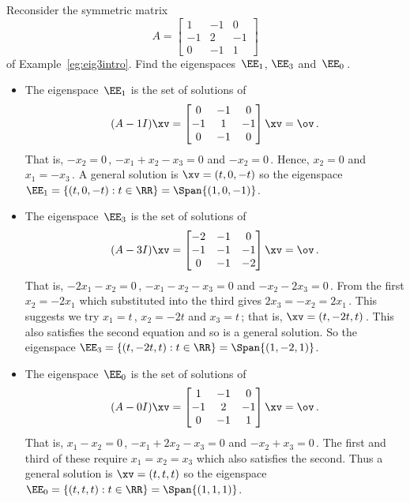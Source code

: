 \begin{example} \label{eg:eig3sp}
Reconsider the symmetric matrix
\begin{equation*}
A=\begin{bmatrix} 1&-1&0\\-1&2&-1\\0&-1&1 \end{bmatrix}
\end{equation*}
of Example~\ref{eg:eig3intro}. 
Find the eigenspaces~\(\EE_1\), \(\EE_3\) and~\(\EE_0\)\,.
\begin{solution} 
\begin{itemize}
\item The eigenspace~\(\EE_1\) is the set of solutions of
\begin{equation*}
(A-1I)\xv=\begin{bmatrix} 0&-1&0\\-1&1&-1\\0&-1&0 \end{bmatrix}
\xv=\ov\,.
\end{equation*}
That is, \(-x_2=0\)\,, \(-x_1+x_2-x_3=0\) and \(-x_2=0\)\,.
Hence, \(x_2=0\) and \(x_1=-x_3\)\,.
A general solution is \(\xv=(t,0,-t)\) so the eigenspace \(\EE_1=\{(t,0,-t) : t\in\RR\}=\Span\{(1,0,-1)\}\).

\item The eigenspace~\(\EE_3\) is the set of solutions of
\begin{equation*}
(A-3I)\xv=\begin{bmatrix} -2&-1&0\\-1&-1&-1\\0&-1&-2 \end{bmatrix}
\xv=\ov\,.
\end{equation*}
That is, \(-2x_1-x_2=0\)\,, \(-x_1-x_2-x_3=0\) and \(-x_2-2x_3=0\)\,.
From the first \(x_2=-2x_1\) which substituted into the third gives \(2x_3=-x_2=2x_1\)\,.  
This suggests we try \(x_1=t\)\,, \(x_2=-2t\) and \(x_3=t\)\,; that is, \(\xv=(t,-2t,t)\)\,.
This also satisfies the second equation and so is a general solution.
So the eigenspace \(\EE_3=\{(t,-2t,t) : t\in\RR\}=\Span\{(1,-2,1)\}\).

\item The eigenspace~\(\EE_0\) is the set of solutions of
\begin{equation*}
(A-0I)\xv=\begin{bmatrix} 1&-1&0\\-1&2&-1\\0&-1&1 \end{bmatrix}
\xv=\ov\,.
\end{equation*}
That is, \(x_1-x_2=0\)\,, \(-x_1+2x_2-x_3=0\) and \(-x_2+x_3=0\)\,.
The first and third of these require \(x_1=x_2=x_3\) which also satisfies the second.
Thus a general solution is \(\xv=(t,t,t)\) so the eigenspace \(\EE_0=\{(t,t,t) : t\in\RR\}=\Span\{(1,1,1)\}\). 
\end{itemize}
\end{solution}
\end{example}


